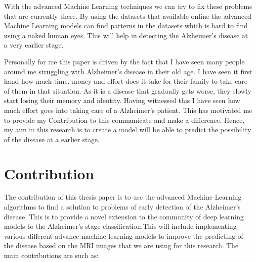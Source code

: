 \documentclass[12pt,onecolumn]{report}
\begin{document}
With the advanced Machine Learning techniques we can try to fix these problems that are currently there. By using the datasets that available online the advanced Machine Learning models can find patterns in the datasets which is hard to find using a naked human eyes. This will help in detecting the  Alzheimer's disease at a very earlier stage. 

Personally for me this paper is driven by the fact that I have seen many people around me struggling with Alzheimer's disease in their old age. I have seen it first hand how much time, money and effort does it take for their family to take care of them in that situation. As it is a disease that gradually gets worse, they slowly start losing their memory and identity. Having witnessed this I have seen how much effort goes into taking care of a Alzheimer's patient. This has motivated me to provide my Contribution to this communicate and make a difference. Hence, my aim in this research is to create a model will be able to predict the possibility of the disease at a earlier stage. 


\chapter{Contribution}

The contribution of this thesis paper is to use the advanced Machine Learning algorithms to find a solution to problems of early detection of the Alzheimer's disease. This is to provide a novel extension to the community of deep learning models to the Alzheimer’s stage classification.This will include implementing various different advance machine learning models to improve the predicting of the disease based on the MRI images that we are using for this research. The main contributions are such as:
\end{document}
